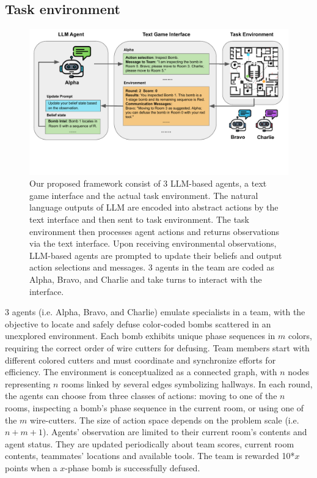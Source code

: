 \documentclass[11pt]{article}
\begin{document}
\subsection{Task environment}
\begin{figure}[h]
\includegraphics[width=\textwidth,trim={0 2.5cm 0 0},clip]{figs/framework_pdf.pdf}
\caption{Our proposed framework consist of 3 LLM-based agents, a text game interface and the actual task environment. The natural language outputs of LLM are encoded into abstract actions by the text interface and then sent to task environment. The task environment then processes agent actions and returns observations via the text interface. Upon receiving environmental observations, LLM-based agents are prompted to update their beliefs and output action selections and messages. 3 agents in the team are coded as Alpha, Bravo, and Charlie and take turns to interact with the interface.}
\label{framework}
\end{figure}
3 agents (i.e. Alpha, Bravo, and Charlie) emulate specialists in a team, with the objective to locate and safely defuse color-coded bombs scattered in an unexplored environment. Each bomb exhibits unique phase sequences in $m$ colors, requiring the correct order of wire cutters for defusing. Team members start with different colored cutters and must coordinate and synchronize efforts for efficiency. The environment is conceptualized as a connected graph, with $n$ nodes representing $n$ rooms linked by several edges symbolizing hallways. In each round, the agents can choose from three classes of actions: moving to one of the $n$ rooms, inspecting a bomb's phase sequence in the current room, or using one of the $m$ wire-cutters. The size of action space depends on the problem scale (i.e. $n+m+1$). Agents' observation are limited to their current room's contents and agent status. They are updated periodically about team scores, current room contents, teammates' locations and available tools. The team is rewarded 10*$x$ points when a $x$-phase bomb is successfully defused. 
\end{document}
